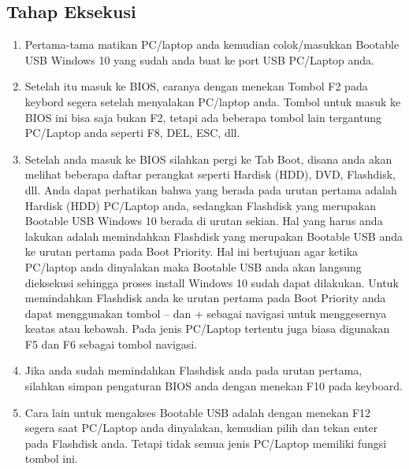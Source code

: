 \subsection{Tahap Eksekusi}
\begin{enumerate}
  \item Pertama-tama matikan PC/laptop anda kemudian colok/masukkan Bootable USB Windows 10 yang sudah anda buat ke port USB PC/Laptop anda.
  \item Setelah itu masuk ke BIOS, caranya dengan menekan Tombol F2 pada keybord segera setelah menyalakan PC/laptop anda. Tombol untuk masuk ke BIOS ini bisa saja bukan F2, tetapi ada beberapa tombol lain tergantung PC/Laptop anda seperti F8, DEL, ESC, dll.
  \item Setelah anda masuk ke BIOS silahkan pergi ke Tab Boot, disana anda akan melihat beberapa daftar perangkat seperti Hardisk (HDD), DVD, Flashdisk, dll. Anda dapat perhatikan bahwa yang berada pada urutan pertama adalah Hardisk (HDD) PC/Laptop anda, sedangkan Flashdisk yang merupakan Bootable USB Windows 10 berada di urutan sekian. Hal yang harus anda lakukan adalah memindahkan Flashdisk yang merupakan Bootable USB anda ke urutan pertama pada Boot Priority. Hal ini bertujuan agar ketika PC/laptop anda dinyalakan maka Bootable USB anda akan langsung dieksekusi sehingga proses install Windows 10 sudah dapat dilakukan. Untuk memindahkan Flashdisk anda ke urutan pertama pada Boot Priority anda dapat menggunakan tombol – dan + sebagai navigasi untuk menggesernya keatas atau kebawah. Pada jenis PC/Laptop tertentu juga biasa digunakan F5 dan F6 sebagai tombol navigasi.
  \item Jika anda sudah memindahkan Flashdisk anda pada urutan pertama, silahkan simpan pengaturan BIOS anda dengan menekan F10 pada keyboard.
  \item Cara lain untuk mengakses Bootable USB adalah dengan menekan F12 segera saat PC/Laptop anda dinyalakan, kemudian pilih dan tekan enter pada Flashdisk anda. Tetapi tidak semua jenis PC/Laptop memiliki fungsi tombol ini.
\end{enumerate}

